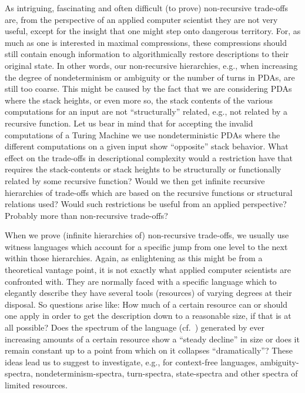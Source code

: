 \documentclass[copyright]{eptcs}
\begin{document}
As intriguing, fascinating and often difficult (to prove) non-recursive trade-offs are, from the perspective of an
applied computer scientist they are not very useful, except for the insight that one might step onto dangerous territory.
For, as much as one is interested in maximal compressions, these compressions should still contain enough information to
algorithmically restore descriptions to their original state. In other words, our non-recursive hierarchies, 
e.g., when increasing the degree of nondeterminism or ambiguity or the number of turns in PDAs, are still too coarse. 
This might be caused by the fact that we are considering PDAs where the stack heights, or even more so, the stack 
contents of the various computations for an input are not ``structurally'' related, e.g., not related by a recursive
function. Let us bear in mind that for accepting the invalid computations of a Turing Machine we use nondeterministic
PDAs where the different computations on a given input show ``opposite'' stack behavior. What effect on the trade-offs
in descriptional complexity would a restriction have that requires the stack-contents or stack heights to be
structurally or functionally related by some recursive function? Would we then get infinite recursive hierarchies of
 trade-offs which are based on the recursive functions or structural relations used? Would such restrictions be useful from an applied perspective? Probably more than non-recursive trade-offs? 

When we prove (infinite hierarchies of) non-recursive trade-offs, we usually use witness languages which account for a 
specific jump from one level to the next within those hierarchies. Again, as enlightening as this might be from a theoretical 
vantage point, it is not exactly what applied computer scientists are confronted with. They are normally faced with a
specific language which to elegantly describe they have several tools (resources) of varying degrees at their disposal.
So questions arise like: How much of a certain resource can or should one apply in order to get the description down to a
reasonable size, if that is at all possible? Does the spectrum of the language  (cf.~\cite{GoldstineKW90}) generated by ever increasing amounts
of a certain resource show a ``steady decline'' in size or does it remain constant up to a point from which on it collapses ``dramatically''? 
These ideas lead us to suggest to investigate, e.g., for context-free languages, ambiguity-spectra, nondeterminism-spectra, 
turn-spectra, state-spectra and other spectra of limited resources. 
\end{document}
